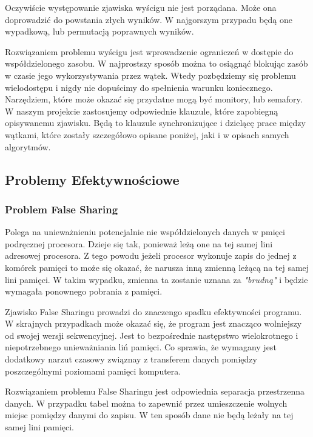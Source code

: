 \documentclass{article}
\begin{document}
                Oczywiście występowanie zjawiska wyścigu nie jest porządana. Może ona doprowadzić do powstania złych wyników. W najgorszym przypadu będą one wypadkową, lub permutacją poprawnych wyników. 
                
                Rozwiązaniem problemu wyścigu jest wprowadzenie ograniczeń w dostępie do współdzielonego zasobu. W najprostszy sposób można to osiągnąć blokując zasób w czasie jego wykorzystywania przez wątek. Wtedy pozbędziemy się problemu wielodostępu i nigdy nie dopuścimy do spełnienia warunku koniecznego. Narzędziem, które może okazać się przydatne mogą być monitory, lub semafory. W naszym projekcie zastosujemy odpowiednie klauzule, które zapobiegną opisywanemu zjawisku. Będą to klauzule synchronizujące i dzielącę prace między wątkami, które zostały szczegółowo opisane poniżej, jaki i w opisach samych algorytmów.
        
        \subsection{Problemy Efektywnościowe}
            \subsubsection{Problem False Sharing}
                Polega na unieważnieniu potencjalnie nie współdzielonych danych w pmięci podręcznej procesora. Dzieje się tak, ponieważ leżą one na tej samej lini adresowej procesora. Z tego powodu jeżeli procesor wykonuje zapis do jednej z komórek pamięci to może się okazać, że narusza inną zmienną leżącą na tej samej lini pamięci. W takim wypadku, zmienna ta zostanie uznana za \emph{"brudną"} i będzie wymagała ponownego pobrania z pamięci.
                
                Zjawisko False Sharingu prowadzi do znaczengo spadku efektywności programu. W skrajnych przypadkach może okazać się, że program jest znacząco wolniejszy od swojej wersji sekwencyjnej. Jest to bezpośrednie następstwo wielokrotnego i niepotrzebnego unieważniania liń pamięci. Co sprawia, że wymagany jest dodatkowy narzut czasowy związnay z transferem danych pomiędzy poszczególnymi poziomami pamięci komputera.
                
                Rozwiązaniem problemu False Sharingu jest odpowiednia separacja przestrzenna danych. W przypadku tabel można to zapewnić przez umieszczenie wolnych miejsc pomiędzy danymi do zapisu. W ten sposób dane nie będą leżały na tej samej lini pamięci.
                
\end{document}
